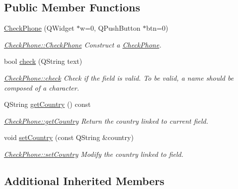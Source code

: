 \subsection*{Public Member Functions}
\begin{DoxyCompactItemize}
\item 
\hyperlink{classGui_1_1Widgets_1_1CheckFields_1_1CheckPhone_ac7103ecce21d8d55ecf46c403eb4b625}{Check\-Phone} (Q\-Widget $\ast$w=0, Q\-Push\-Button $\ast$btn=0)
\begin{DoxyCompactList}\small\item\em \hyperlink{classGui_1_1Widgets_1_1CheckFields_1_1CheckPhone_ac7103ecce21d8d55ecf46c403eb4b625}{Check\-Phone\-::\-Check\-Phone} Construct a \hyperlink{classGui_1_1Widgets_1_1CheckFields_1_1CheckPhone}{Check\-Phone}. \end{DoxyCompactList}\item 
bool \hyperlink{classGui_1_1Widgets_1_1CheckFields_1_1CheckPhone_a15e8da6b25e752c6fb816e6655bdb062}{check} (Q\-String text)
\begin{DoxyCompactList}\small\item\em \hyperlink{classGui_1_1Widgets_1_1CheckFields_1_1CheckPhone_a15e8da6b25e752c6fb816e6655bdb062}{Check\-Phone\-::check} Check if the field is valid. To be valid, a name should be composed of a character. \end{DoxyCompactList}\item 
Q\-String \hyperlink{classGui_1_1Widgets_1_1CheckFields_1_1CheckPhone_ae68d979332fba8523ec69a7e85790ed6}{get\-Country} () const 
\begin{DoxyCompactList}\small\item\em \hyperlink{classGui_1_1Widgets_1_1CheckFields_1_1CheckPhone_ae68d979332fba8523ec69a7e85790ed6}{Check\-Phone\-::get\-Country} Return the country linked to current field. \end{DoxyCompactList}\item 
void \hyperlink{classGui_1_1Widgets_1_1CheckFields_1_1CheckPhone_ac59318e7efa5616389b9eb3a55daaead}{set\-Country} (const Q\-String \&country)
\begin{DoxyCompactList}\small\item\em \hyperlink{classGui_1_1Widgets_1_1CheckFields_1_1CheckPhone_ac59318e7efa5616389b9eb3a55daaead}{Check\-Phone\-::set\-Country} Modify the {\itshape country} linked to field. \end{DoxyCompactList}\end{DoxyCompactItemize}
\subsection*{Additional Inherited Members}


